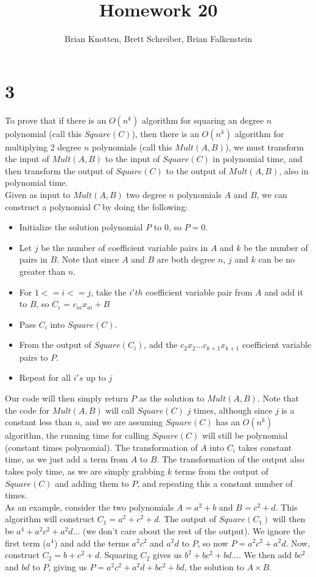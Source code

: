 \documentclass[letterpaper,notitlepage,twoside]{article}
\begin{document}
\title{Homework 20}
\author{Brian Knotten, Brett Schreiber, Brian Falkenstein}
\maketitle
\section*{3}
To prove that if there is an $O(n^k)$ algorithm for squaring an degree $n$ polynomial (call this $Square(C)$), then there is an $O(n^k)$ algorithm for multiplying 2 degree $n$ polynomials (call this $Mult(A, B)$), we must transform the input of $Mult(A, B)$ to the input of $Square(C)$ in polynomial time, and then transform the output of $Square(C)$ to the output of $Mult(A, B)$, also in polynomial time. \\
Given as input to $Mult(A, B)$ two degree $n$ polynomials $A$ and $B$, we can construct a polynomial $C$ by doing the following: 
\begin{itemize}
\item Initialize the solution polynomial $P$ to 0, so $P=0$. 
\item Let $j$ be the number of coefficient variable pairs in $A$ and $k$ be the number of pairs in $B$. Note that since $A$ and $B$ are both degree $n$, $j$ and $k$ can be no greater than $n$. 
\item For $1<=i<=j$, take the $i'th$ coefficient variable pair from $A$ and add it to $B$, so $C_i$ = $c_{ai}x_{ai} + B$
\item Pass $C_i$ into $Square(C)$.
\item From the output of $Square(C_i)$, add the $c_2x_2 ... c_{k+1}x_{k+1}$ coefficient variable pairs to $P$. 
\item Repeat for all $i's$ up to $j$
\end{itemize}
Our code will then simply return $P$ as the solution to $Mult(A, B)$. Note that the code for $Mult(A, B)$ will call $Square(C)$ $j$ times, although since $j$ is a constant less than $n$, and we are assuming $Square(C)$ has an $O(n^k)$ algorithm, the running time for calling $Square(C)$ will still be polynomial (constant times polynomial). The transformation of $A$ into $C_i$ takes constant time, as we just add a term from $A$ to $B$. The transformation of the output also takes poly time, as we are simply grabbing $k$ terms from the output of $Square(C)$ and adding them to $P$, and repeating this a constant number of times. \\
As an example, consider the two polynomials $A=a^2 + b$ and $B = c^2 + d$. This algorithm will construct $C_1 = a^2 + c^2 + d$. The output of $Square(C_1)$ will then be $a^4 + a^2c^2 + a^2d...$ (we don't care about the rest of the output). We ignore the first term ($a^4$) and add the terms $a^2c^2$ and $a^2d$ to $P$, so now $P = a^2c^2 + a^2d$. Now, construct $C_2 = b + c^2 + d$. Squaring $C_2$ gives us $b^2 + bc^2 + bd ...$. We then add $bc^2$ and $bd$ to $P$, giving us $P=a^2c^2 + a^2d + bc^2 + bd$, the solution to $A\times B$. 
\end{document}
